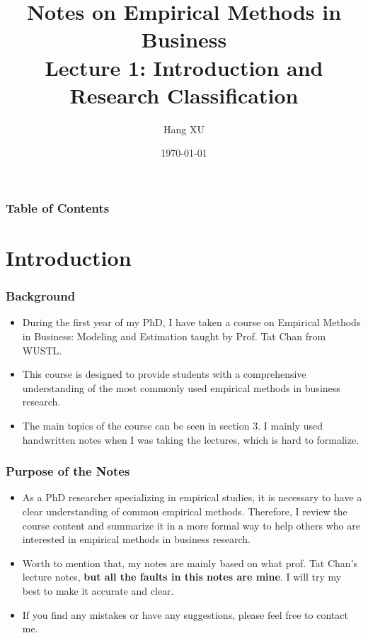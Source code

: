 \documentclass[10pt]{beamer}
\title{Notes on Empirical Methods in Business \\ Lecture 1: Introduction and Research Classification}
\author{Hang XU}
\institute{hxuch@connect.ust.hk}
\date{\today}
\begin{document}
\frame{\titlepage}

\begin{frame}
\frametitle{Table of Contents}
\tableofcontents
\end{frame}

\section{Introduction}
\begin{frame}
\frametitle{Background}
\justifying
\begin{itemize}
    \item During the first year of my PhD, I have taken a course on Empirical Methods in Business: Modeling and Estimation taught by Prof. Tat Chan from WUSTL. 
    \item This course is designed to provide students with a comprehensive understanding of the most commonly used empirical methods in business research. 
    \item The main topics of the course can be seen in section 3. I mainly used handwritten notes when I was taking the lectures, which is hard to formalize. 
\end{itemize}
\end{frame}

\begin{frame}
\frametitle{Purpose of the Notes}
\justifying
\begin{itemize}
    \item As a PhD researcher specializing in empirical studies, it is necessary to have a clear understanding of common empirical methods. Therefore, I review the course content and summarize it in a more formal way to help others who are interested in empirical methods in business research.
    \item Worth to mention that, my notes are mainly based on what prof. Tat Chan's lecture notes, \textbf{but all the faults in this notes are mine}. I will try my best to make it accurate and clear. 
    \item If you find any mistakes or have any suggestions, please feel free to contact me.
\end{itemize}
\end{frame}
\end{document}
